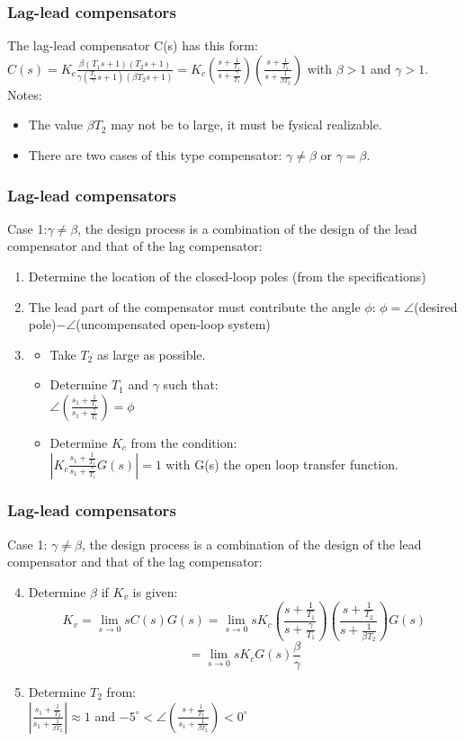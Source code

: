 \begin{frame}
	\frametitle{Lag-lead compensators}
	The lag-lead compensator C(s) has this form: \\
	$C(s)=K_c\frac{\beta (T_1s+1)(T_2s+1)}{\gamma (\frac{T_1}{\gamma}s+1)(\beta T_2s+1)}=K_c(\frac{s+\frac{1}{T_1}}{s+\frac{\gamma}{T_1}})
	(\frac{s+\frac{1}{T_2}}{s+\frac{1}{\beta T_2}})$ with $\beta>1$ and $\gamma>1$.\vspace{4mm}
	Notes:
	\begin{itemize}
		\item The value $\beta T_2$ may not be to large, it must be fysical realizable.
		\item  There are two cases of this type compensator: $\gamma\neq \beta$ or $\gamma= \beta$.
	\end{itemize}
\end{frame}

\begin{frame}
	\frametitle{Lag-lead compensators}
	Case 1:$\gamma\neq \beta$,  the design process is a combination of the design of the lead compensator and that of the lag compensator:
	\begin{enumerate}
		\item Determine the location of the closed-loop poles (from the specifications)
		\item The lead part of the compensator must contribute the angle $\phi$: $\phi=\angle$(desired pole)$-\angle$(uncompensated open-loop system)
		\item 
		\begin{itemize}
			\item Take $T_2$ as large as possible.
			\item Determine $T_1$ and $\gamma$ such that:\\ 
			$\angle(\frac{s_1+\frac{1}{T_1}}{s_1+\frac{\gamma}{T_1}})=\phi$
			\item Determine $K_c$ from the condition:\\
			$|K_c\frac{s_1+\frac{1}{T_1}}{s_1+\frac{\gamma}{T_1}}G(s)|=1$ with G(s) the open loop transfer function.
		\end{itemize}
	\end{enumerate}
\end{frame}

\begin{frame}
	\frametitle{Lag-lead compensators}
	Case 1: $\gamma\neq \beta$,  the design process is a combination of the design of the lead compensator and that of the lag compensator:
	\begin{enumerate}
		\setcounter{enumi}{3}
		\item Determine $\beta$ if $K_v$ is given:
		$$K_v=\lim_{s\to0}sC(s)G(s)=\lim_{s\to 0}sK_c(\frac{s+\frac{1}{T_1}}{s+\frac{\gamma}{T_1}})
		(\frac{s+\frac{1}{T_2}}{s+\frac{1}{\beta T_2}})G(s)$$
		$$=\lim_{s\to0}sK_cG(s)\frac{\beta}{\gamma}$$
		\item Determine $T_2$ from:\\
		$|\frac{s_1+\frac{1}{T_2}}{s_1+\frac{1}{\beta T_2}}|\approx 1$ and $-5^{\circ}<\angle(\frac{s+\frac{1}{T_2}}{s_1+\frac{1}{\beta T_2}})<0^{\circ}$
	\end{enumerate}
\end{frame}

